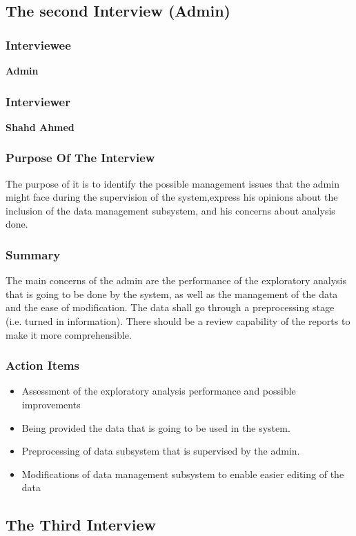 \documentclass{article}
\begin{document}
\subsection{The second Interview (Admin)}
\subsubsection{Interviewee}
\textbf{Admin}
\subsubsection{Interviewer}
\textbf{Shahd Ahmed}
\subsubsection{Purpose Of The Interview}
The purpose of it is to identify the possible management issues that the admin might face during the supervision of the system,express his opinions about the inclusion of the data management subsystem, and his concerns about analysis done.
\subsubsection{Summary}
The main concerns of the admin are the performance of the exploratory analysis that is going to be done by the system, as well as the management of the data and the ease of modification. The data shall go through a preprocessing stage (i.e. turned in information). There should be a review capability of the reports to make it more comprehensible.
\subsubsection{Action Items}
\begin{itemize}
    \item Assessment of the exploratory analysis performance and possible improvements
    \item Being provided the data that is going to be used in the system.
    \item Preprocessing of data subsystem that is supervised by the admin.
    \item Modifications of data management subsystem to enable easier editing of the data
\end{itemize}

\subsection{The Third Interview}
\end{document}
